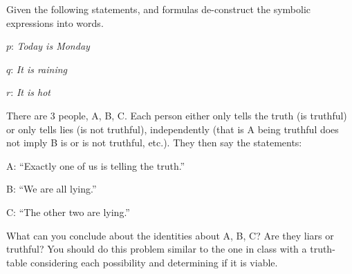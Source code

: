 \documentclass[addpoints, answers]{exam}
\begin{document}
\begin{questions}
\begin{parts}
  \end{parts}

  \question Given the following statements, and formulas de-construct the
  symbolic expressions into words.
  \begin{center}
    $p$: \emph{Today is Monday}

    $q$: \emph{It is raining}

    $r$: \emph{It is hot}
  \end{center}


  \question[12] There are 3 people, A, B, C. Each person either only tells the
  truth (is truthful) or only tells lies (is not truthful), independently (that
  is A being truthful does not imply B is or is not truthful, etc.). They then
  say the statements:

  \begin{center}
    A: ``Exactly one of us is telling the truth.''

    B: ``We are all lying.''

    C: ``The other two are lying.''
  \end{center}

  What can you conclude about the identities about A, B, C? Are they liars or
  truthful? You should do this problem similar to the one in class with a
  truth-table considering each possibility and determining if it is viable.
  \begin{solution}


\end{solution}
\end{questions}
\end{document}
